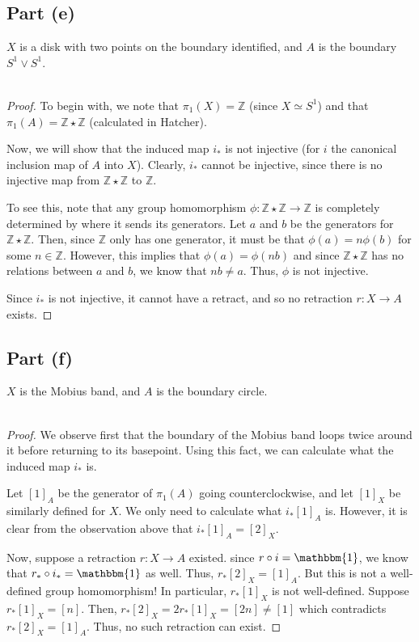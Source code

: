 \documentclass[fontsize=11pt]{scrartcl} %
\numberwithin{equation}{section} %
\numberwithin{figure}{section} %
\numberwithin{table}{section} %
\newcommand{\Z}{\mathbb{Z}}
\begin{document}
\subsection*{Part (e)}
$X$ is a disk with two points on the boundary identified, and $A$ is the
boundary $S^1\vee S^1$.
\\
\\
\begin{proof}
    To begin with, we note that $\pi_1(X) = \Z$ (since $X\simeq S^1$) and that
    $\pi_1(A)=\Z\star\Z$ (calculated in Hatcher).

    Now, we will show that the induced map $i_*$ is not injective (for $i$ the
    canonical inclusion map of $A$ into $X$). Clearly, $i_*$ cannot be
    injective, since there is no injective map from $\Z\star\Z$ to $\Z$.
    
    To see this, note that any group homomorphism $\phi:\Z\star\Z\to\Z$ is
    completely determined by where it sends its generators. Let $a$ and $b$ be
    the generators for $\Z\star\Z$. Then, since $\Z$ only has one generator, it
    must be that $\phi(a) = n\phi(b)$ for some $n\in\Z$. However, this implies
    that $\phi(a) = \phi(nb)$ and since $\Z\star\Z$ has no relations between $a$
    and $b$, we know that $nb\neq a$. Thus, $\phi$ is not injective.

    Since $i_*$ is not injective, it cannot have a retract, and so no
    retraction $r:X\to A$ exists.
\end{proof}
\subsection*{Part (f)}
$X$ is the Mobius band, and $A$ is the boundary circle.
\\
\\
\begin{proof}
    We observe first that the boundary of the Mobius band loops twice around it
    before returning to its basepoint. Using this fact, we can calculate what
    the induced map $i_*$ is.

    Let $[1]_A$ be the generator of $\pi_1(A)$ going counterclockwise, and let
    $[1]_X$ be similarly defined for $X$. We only need to calculate what
    $i_*[1]_A$ is. However, it is clear from the observation above that
    $i_*[1]_A = [2]_X$.

    Now, suppose a retraction $r:X\to A$ existed. since $r\circ i  =
    \mathbbm{1}$, we know that $r_*\circ i_* = \mathbbm{1}$ as well. Thus,
    $r_*[2]_X = [1]_A$. But this is not a well-defined group homomorphism! In
    particular, $r_*[1]_X$ is not well-defined. Suppose $r_*[1]_X = [n]$. Then,
    $r_*[2]_X = 2r_*[1]_X = [2n] \neq [1]$ which contradicts $r_*[2]_X = [1]_A$.
    Thus, no such retraction can exist.
\end{proof}
\end{document}
